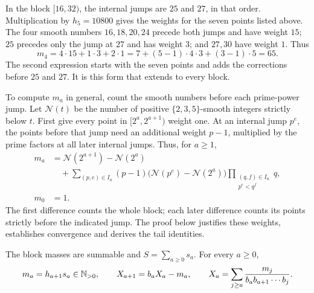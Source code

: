 \documentclass[11pt]{article}
\theoremstyle{remark}
\theoremstyle{plain}
\begin{document}
In the block $[16,32)$, the internal jumps are $25$ and $27$, in that
order. Multiplication by $h_5=10800$ gives the weights for the seven
points listed above.  The four smooth numbers
$16,18,20,24$ precede both jumps and have weight $15$; $25$ precedes only
the jump at $27$ and has weight $3$; and $27,30$ have weight $1$.  Thus
\[
 m_4=4\cdot15+1\cdot3+2\cdot1
     =7+(5-1)\cdot4\cdot3+(3-1)\cdot5=65.
\]
The second expression starts with the seven points and adds the
corrections before $25$ and $27$.  It is this form that extends to every
block.

To compute $m_a$ in general, count the smooth numbers before each
prime-power jump.
Let $\mathcal N(t)$ be the number of positive $\{2,3,5\}$-smooth integers
strictly below $t$.  First give every point in $[2^a,2^{a+1})$ weight one.
At an internal jump $p^e$, the points before that jump need an additional
weight $p-1$, multiplied by the prime factors at all later internal jumps.
Thus, for $a\ge1$,
\begin{equation}\label{long269:eq:actual-digit}
\begin{aligned}
 m_a&=\mathcal N(2^{a+1})-\mathcal N(2^a)\\
 &\quad+\sum_{(p,e)\in I_a}(p-1)
       \bigl(\mathcal N(p^e)-\mathcal N(2^a)\bigr)
       \prod_{\substack{(q,f)\in I_a\\p^e<q^f}}q,\\
 m_0&=1.
\end{aligned}
\end{equation}
The first difference counts the whole block; each later difference counts
its points strictly before the indicated jump.  The proof below justifies
these weights, establishes convergence and derives the tail identities.

\begin{theorem}\label{long269:res:actual-orbit}
The block masses are summable and $S=\sum_{a\ge0}s_a$.  For every $a\ge0$,
\begin{equation}\label{long269:eq:shell-digit-identity}
 m_a=h_{a+1}s_a\in\N_{>0},
 \qquad
 X_{a+1}=b_aX_a-m_a,
 \qquad
 X_a=\sum_{j\ge a}\frac{m_j}{b_ab_{a+1}\cdots b_j} .
\end{equation}
\end{theorem}
\end{document}
